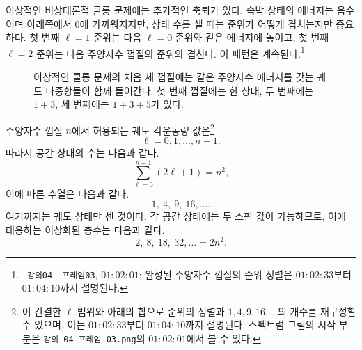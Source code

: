 이상적인 비상대론적 쿨롱 문제에는 추가적인 축퇴가 있다. 속박 상태의 에너지는 음수이며 아래쪽에서 0에 가까워지지만, 상태 수를 셀 때는 준위가 어떻게 겹치는지만 중요하다. 첫 번째 \(\ell=1\) 준위는 다음 \(\ell=0\) 준위와 같은 에너지에 놓이고, 첫 번째 \(\ell=2\) 준위는 다음 주양자수 껍질의 준위와 겹친다. 이 패턴은 계속된다.\footnote{\texttt{\_강의04\_\_프레임03}, \(01{:}02{:}01\); 완성된 주양자수 껍질의 준위 정렬은 \(01{:}02{:}33\)부터 \(01{:}04{:}10\)까지 설명된다.}

\begin{figure}[htbp]
\centering
{}
\caption{이상적인 쿨롱 문제의 처음 세 껍질에는 같은 주양자수 에너지를 갖는 궤도 다중항들이 함께 들어간다. 첫 번째 껍질에는 한 상태, 두 번째에는 \(1+3\), 세 번째에는 \(1+3+5\)가 있다.}
\end{figure}

주양자수 껍질 \(n\)에서 허용되는 궤도 각운동량 값은\footnote{이 간결한 \(\ell\) 범위와 아래의 합으로 준위의 정렬과 \(1,4,9,16,\ldots\)의 개수를 재구성할 수 있으며, 이는 \(01{:}02{:}33\)부터 \(01{:}04{:}10\)까지 설명된다. 스펙트럼 그림의 시작 부분은 \texttt{강의\_04\_프레임\_03.png}의 \(01{:}02{:}01\)에서 볼 수 있다.}
\[
\ell=0,1,\ldots,n-1.
\]
따라서 공간 상태의 수는 다음과 같다.
\begin{equation}
\sum_{\ell=0}^{n-1}(2\ell+1)=n^{2},
\end{equation}
이에 따른 수열은 다음과 같다.
\begin{equation}
1,\ 4,\ 9,\ 16,\ldots .
\end{equation}
여기까지는 궤도 상태만 센 것이다. 각 공간 상태에는 두 스핀 값이 가능하므로, 이에 대응하는 이상화된 총수는 다음과 같다.
\begin{equation}
2,\ 8,\ 18,\ 32,\ldots=2n^{2}.
\end{equation}

